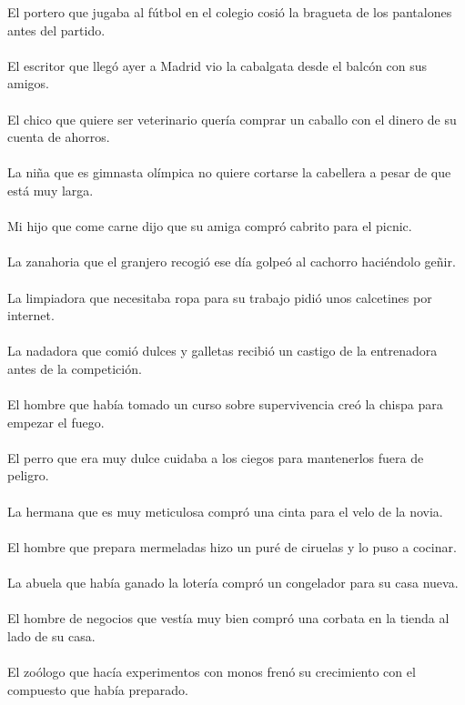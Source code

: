 El portero que jugaba al f\'{u}tbol en el colegio cosi\'{o} la bragueta de los pantalones antes del partido.	\\	\\
El escritor que lleg\'{o} ayer a Madrid vio la cabalgata desde el balc\'{o}n con sus amigos.	\\	\\
El chico que quiere ser veterinario quer\'{i}a comprar un caballo con el dinero de su cuenta de ahorros.	\\	\\
La ni\~{n}a que es gimnasta ol\'{i}mpica no quiere cortarse la cabellera a pesar de que est\'{a} muy larga.	\\	\\
Mi hijo que come carne dijo que su amiga compr\'{o} cabrito para el picnic.	\\	\\
La zanahoria que el granjero recogi\'{o} ese d\'{i}a golpe\'{o} al cachorro haciéndolo ge\~{n}ir.	\\	\\
La limpiadora que necesitaba ropa para su trabajo pidi\'{o} unos calcetines por internet.	\\	\\
La nadadora que comi\'{o} dulces y galletas recibi\'{o} un castigo de la entrenadora antes de la competici\'{o}n.	\\	\\
El hombre que hab\'{i}a tomado un curso sobre supervivencia cre\'{o} la chispa para empezar el fuego.	\\	\\
El perro que era muy dulce cuidaba a los ciegos para mantenerlos fuera de peligro.	\\	\\
La hermana que es muy meticulosa compr\'{o} una cinta para el velo de la novia.	\\	\\
El hombre que prepara mermeladas hizo un puré de ciruelas y lo puso a cocinar.	\\	\\
La abuela que hab\'{i}a ganado la loter\'{i}a compr\'{o} un congelador para su casa nueva.	\\	\\
El hombre de negocios que vest\'{i}a muy bien compr\'{o} una corbata en la tienda al lado de su casa.	\\	\\
El zo\'{o}logo que hac\'{i}a experimentos con monos fren\'{o} su crecimiento con el compuesto que hab\'{i}a preparado.	\\	\\
